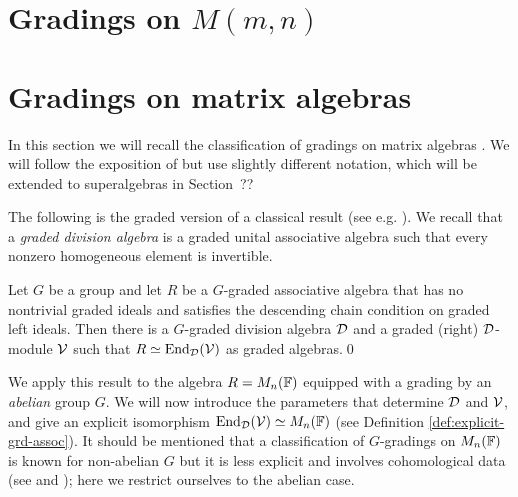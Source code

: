 \section{Gradings on $M(m,n)$}\label{sec:Mmn}

\section{Gradings on matrix algebras}
\label{sec:gradings-on-matrix-algebras}

In this section we will recall the classification of gradings on matrix algebras \cite{BSZ01, BZ02, BK10}. We will follow the exposition of \cite[Chapter 2]{livromicha} but use slightly different notation, which will be extended to superalgebras in Section~??%

The following is the graded version of a classical result (see e.g. \cite[Theorem 2.6]{livromicha}). 
We recall that a \emph{graded division algebra} is a graded unital associative algebra such that every nonzero homogeneous element is invertible.

\begin{thm}\label{thm:End-over-D}
	Let $G$ be a group and let $R$ be a $G$-graded associative algebra that has no nontrivial graded ideals and satisfies the descending chain condition on 
	graded left ideals. Then there is a $G$-graded division algebra $\mathcal{D}$ and a graded (right) $\mathcal{D}$-module $\mathcal V$ such that $R \simeq \operatorname{End}_{\mathcal{D}} (\mathcal V)$ as graded algebras.\qed
\end{thm}

We apply this result to the algebra $R=M_n(\mathbb{F})$ equipped with a grading by an \emph{abelian} group $G$. We will now introduce the parameters that determine 
$\mathcal D$ and $\mathcal V$, and give an explicit isomorphism $\operatorname{End}_{\mathcal{D}} (\mathcal V)\simeq M_n(\mathbb{F})$ (see Definition \ref{def:explicit-grd-assoc}). It should be mentioned that a classification of $G$-gradings on $M_n(\mathbb{F})$ is known for non-abelian $G$ but it is less explicit and involves cohomological data (see \cite[Corollary 2.22]{livromicha} and \cite[Theorem 1.3]{GS}); here we restrict ourselves to the abelian case.


